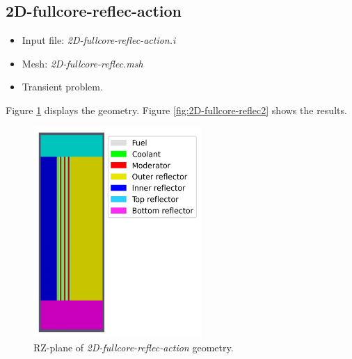 \documentclass[11pt,letterpaper]{article}
\begin{document}
\subsection{2D-fullcore-reflec-action}

	\begin{itemize}
		\item Input file: \textit{2D-fullcore-reflec-action.i}
		\item Mesh: \textit{2D-fullcore-reflec.msh}
		\item Transient problem.
	\end{itemize}

Figure \ref{fig:2D-fullcore-reflec} displays the geometry.
Figure \ref{fig:2D-fullcore-reflec2} shows the results.

	\begin{figure}[htbp!]
		\centering
		\includegraphics[height=8cm]{2D-fullcore-reflec-meshB}
		\caption{RZ-plane of \textit{2D-fullcore-reflec-action} geometry.}
		\label{fig:2D-fullcore-reflec}
	\end{figure}
\end{document}
